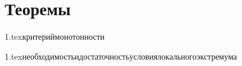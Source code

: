 





















\section{Теоремы}

{1.tex}{критериймонотонности}

{1.tex}{необходимостьидостаточностьусловиялокальногоэкстремума}

